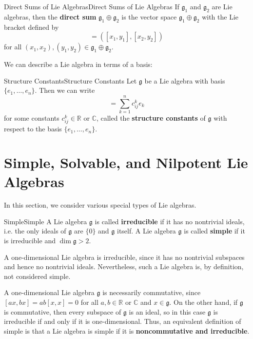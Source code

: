 \documentclass[../main.tex]{subfiles}
\begin{document}
\begin{definition}{Direct Sums of Lie Algebras}{Direct Sums of Lie Algebras}
  If $\mathfrak{g}_1$ and $\mathfrak{g}_2$ are Lie algebras, then the \textbf{direct sum} $\mathfrak{g}_1\oplus\mathfrak{g}_2$ is the vector space $\mathfrak{g}_1\oplus\mathfrak{g}_2$ with the Lie bracket defined by
  \begin{equation}
    [(x_1,x_2),(y_1,y_2)]=([x_1,y_1],[x_2,y_2])
  \end{equation}
  for all $(x_1,x_2),(y_1,y_2)\in\mathfrak{g}_1\oplus\mathfrak{g}_2$.
\end{definition}

We can describe a Lie algebra in terms of a basis:
\begin{definition}{Structure Constants}{Structure Constants}
  Let $\mathfrak{g}$ be a Lie algebra with basis $\{e_1,\ldots,e_n\}$. Then we can write
  \begin{equation}
    [e_i,e_j]=\sum_{k=1}^n c_{ij}^k e_k
  \end{equation}
  for some constants $c_{ij}^k\in\mathbb{R}$ or $\mathbb{C}$, called the \textbf{structure constants} of $\mathfrak{g}$ with respect to the basis $\{e_1,\ldots,e_n\}$.
\end{definition}

\section{Simple, Solvable, and Nilpotent Lie Algebras}
In this section, we consider various special types of Lie algebras.

\begin{definition}{Simple}{Simple}
  A Lie algebra $\mathfrak{g}$ is called \textbf{irreducible} if it has no nontrivial ideals, i.e. the only ideals of $\mathfrak{g}$ are $\{0\}$ and $\mathfrak{g}$ itself. A Lie algebra $\mathfrak{g}$ is called \textbf{simple} if it is irreducible and $\dim\mathfrak{g}>2$.
\end{definition}

A one-dimensional Lie algebra is irreducible, since it has no nontrivial subspaces and hence no nontrivial ideals. Nevertheless, such a Lie algebra is, by definition, not considered simple.

A one-dimensional Lie algebra $\mathfrak{g}$ is necessarily commutative, since $[ax, bx]=ab[x,x]=0$ for all $a,b\in\mathbb{R}$ or $\mathbb{C}$ and $x\in\mathfrak{g}$. On the other hand, if $\mathfrak{g}$ is commutative, then every subspace of $\mathfrak{g}$ is an ideal, so in this case $\mathfrak{g}$ is irreducible if and only if it is one-dimensional. Thus, an equivalent definition of simple is that a Lie algebra is simple if it is \textbf{noncommutative and irreducible}.
\end{document}
